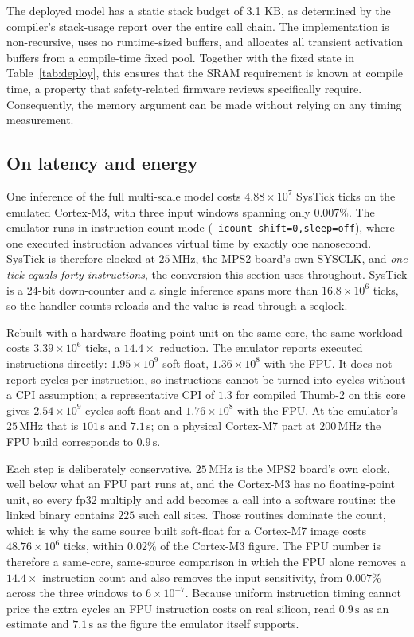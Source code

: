 \documentclass[final,5p,times,twocolumn]{elsarticle}
\begin{document}
The deployed model has a static stack budget of 3.1 KB, as determined by the compiler's stack-usage report 
over the entire call chain. The implementation is non-recursive, uses no runtime-sized buffers, 
and allocates all transient activation buffers from a compile-time fixed pool. Together with the fixed state in Table~\ref{tab:deploy},
this ensures that the SRAM requirement is known at compile time, a property that safety-related firmware reviews
specifically require. Consequently, the memory argument can be made without relying on any timing measurement.

\subsection{On latency and energy}
\label{sec:latency}

One inference of the full multi-scale model costs $4.88\times10^{7}$
SysTick ticks on the emulated Cortex-M3, with three input windows
spanning only $0.007\%$. The emulator runs in instruction-count mode
(\texttt{-icount shift=0,sleep=off}), where one executed instruction
advances virtual time by exactly one nanosecond. SysTick is therefore
clocked at $25\,\mathrm{MHz}$, the MPS2 board's own SYSCLK, and
\emph{one tick equals forty instructions}, the conversion this section
uses throughout. SysTick is a 24-bit down-counter and a single
inference spans more than $16.8\times10^{6}$ ticks, so the handler
counts reloads and the value is read through a seqlock.

Rebuilt with a hardware floating-point unit on the same core, the same
workload costs $3.39\times10^{6}$ ticks, a $14.4\times$ reduction. The
emulator reports executed instructions directly: $1.95\times10^{9}$
soft-float, $1.36\times10^{8}$ with the FPU. It does not report cycles
per instruction, so instructions cannot be turned into cycles without a
CPI assumption; a representative CPI of $1.3$ for compiled Thumb-2 on
this core gives $2.54\times10^{9}$ cycles soft-float and
$1.76\times10^{8}$ with the FPU. At the emulator's $25\,\mathrm{MHz}$
that is $101\,\mathrm{s}$ and $7.1\,\mathrm{s}$; on a physical
Cortex-M7 part at $200\,\mathrm{MHz}$ the FPU build corresponds to
$0.9\,\mathrm{s}$.

Each step is deliberately conservative. $25\,\mathrm{MHz}$ is the MPS2
board's own clock, well below what an FPU part runs at, and the
Cortex-M3 has no floating-point unit, so every fp32 multiply and add
becomes a call into a software routine: the linked binary contains
$225$ such call sites. Those routines dominate the count, which is why
the same source built soft-float for a Cortex-M7 image costs
$48.76\times10^{6}$ ticks, within $0.02\%$ of the Cortex-M3 figure. The
FPU number is therefore a same-core, same-source comparison in which
the FPU alone removes a $14.4\times$ instruction count and also removes
the input sensitivity, from $0.007\%$ across the three windows to
$6\times10^{-7}$. Because uniform instruction timing cannot price the
extra cycles an FPU instruction costs on real silicon, read
$0.9\,\mathrm{s}$ as an estimate and $7.1\,\mathrm{s}$ as the figure
the emulator itself supports.
\end{document}
